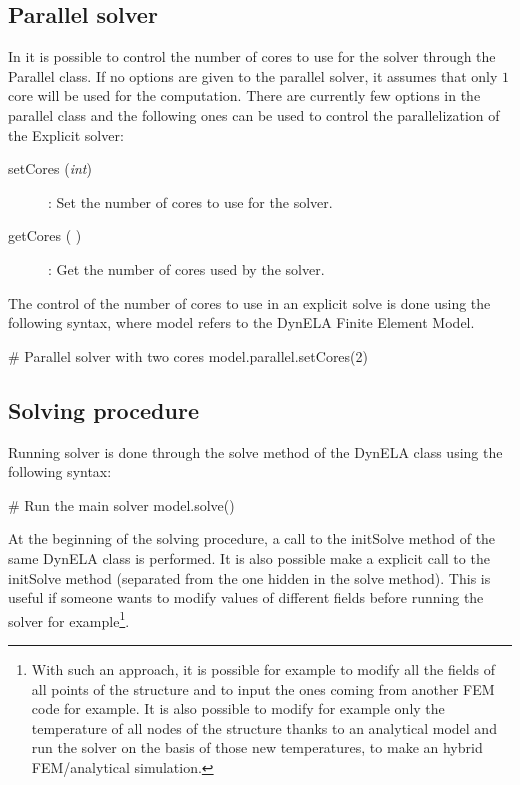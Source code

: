 \subsection{Parallel solver}
In \DynELA it is possible to control the number of cores to use for the solver through the \textsf{Parallel} class. If no options are given to the parallel solver, it assumes that only $1$ core will be used for the computation. There are currently few options in the parallel class and the following ones can be used to control the parallelization of the Explicit solver:
\begin{description}
\item [{setCores (\emph{int})}] : Set the number of cores to use for the solver.
\item [{getCores ( )}] : Get the number of cores used by the solver.
\end{description}
The control of the number of cores to use in an explicit solve is done using the following syntax, where \textsf{model} refers to the DynELA Finite Element Model.
\begin{PythonListing}
# Parallel solver with two cores
model.parallel.setCores(2)
\end{PythonListing}

\subsection{Solving procedure}
Running solver is done through the \textsf{solve} method of the \textsf{DynELA} class using the following syntax:
\begin{PythonListing}
# Run the main solver
model.solve()
\end{PythonListing}
At the beginning of the solving procedure, a call to the \textsf{initSolve} method of the same \textsf{DynELA} class is performed. It is also possible make a explicit call to the \textsf{initSolve} method (\ie separated from the one hidden in the solve method). This is useful if someone wants to modify values of different fields before running the solver for example\footnote{With such an approach, it is possible for example to modify all the fields of all points of the structure and to input the ones coming from another FEM code for example. It is also possible to modify for example only the temperature of all nodes of the structure thanks to an analytical model and run the solver on the basis of those new temperatures, \ie to make an hybrid FEM/analytical simulation.}.

